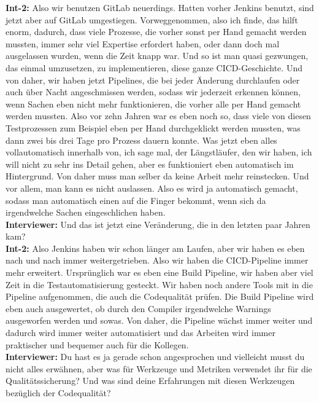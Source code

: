 \textbf{Int-2:} Also wir benutzen GitLab neuerdings. Hatten vorher Jenkins benutzt, sind jetzt aber auf GitLab umgestiegen. Vorweggenommen, also ich finde, das hilft enorm, dadurch, dass viele Prozesse, die vorher sonst per Hand gemacht werden mussten, immer sehr viel Expertise erfordert haben, oder dann doch mal ausgelassen wurden, wenn die Zeit knapp war. Und so ist man quasi gezwungen, das einmal umzusetzen, zu implementieren, diese ganze CICD-Geschichte. Und von daher, wir haben jetzt Pipelines, die bei jeder Änderung durchlaufen oder auch über Nacht angeschmissen werden, sodass wir jederzeit erkennen können, wenn Sachen eben nicht mehr funktionieren, die vorher alle per Hand gemacht werden mussten. Also vor zehn Jahren war es eben noch so, dass viele von diesen Testprozessen zum Beispiel eben per Hand durchgeklickt werden mussten, was dann zwei bis drei Tage pro Prozess dauern konnte. Was jetzt eben alles vollautomatisch innerhalb von, ich sage mal, der Längstläufer, den wir haben, ich will nicht zu sehr ins Detail gehen, aber es funktioniert eben automatisch im Hintergrund. Von daher muss man selber da keine Arbeit mehr reinstecken. Und vor allem, man kann es nicht auslassen. Also es wird ja automatisch gemacht, sodass man automatisch einen auf die Finger bekommt, wenn sich da irgendwelche Sachen eingeschlichen haben. \\
\textbf{Interviewer:} Und das ist jetzt eine Veränderung, die in den letzten paar Jahren kam?\\
\textbf{Int-2:} Also Jenkins haben wir schon länger am Laufen, aber wir haben es eben nach und nach immer weitergetrieben. Also wir haben die CICD-Pipeline immer mehr erweitert. Ursprünglich war es eben eine Build Pipeline, wir haben aber viel Zeit in die Testautomatisierung gesteckt. Wir haben noch andere Tools mit in die Pipeline aufgenommen, die auch die Codequalität prüfen. Die Build Pipeline wird eben auch ausgewertet, ob durch den Compiler irgendwelche Warnings ausgeworfen werden und sowas. Von daher, die Pipeline wächst immer weiter und dadurch wird immer weiter automatisiert und das Arbeiten wird immer praktischer und bequemer auch für die Kollegen. \\
\textbf{Interviewer:} Du hast es ja gerade schon angesprochen und vielleicht musst du nicht alles erwähnen, aber was für Werkzeuge und Metriken verwendet ihr für die Qualitätssicherung? Und was sind deine Erfahrungen mit diesen Werkzeugen bezüglich der Codequalität?\\
